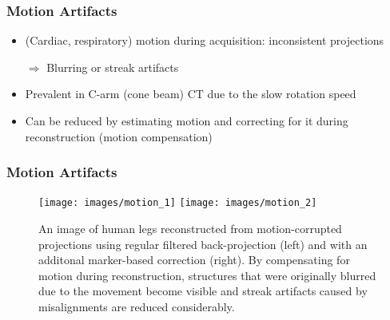\begin{frame}
	\frametitle{Motion Artifacts}

	\begin{itemize}
		\setlength\itemsep{0.3cm}
		\item (Cardiac, respiratory) motion during acquisition: inconsistent projections
		\item[$\Rightarrow$] Blurring or streak artifacts
		\item Prevalent in C-arm (cone beam) CT due to the slow rotation speed
		\item Can be reduced by estimating motion and correcting for it during reconstruction (motion compensation)

	\end{itemize}

\end{frame}


\begin{frame}
	\frametitle{Motion Artifacts}

	\begin{figure}[tbp]
		\centering
		\texttt{[image: images/motion\_1]}
		\hspace{1cm}
		\texttt{[image: images/motion\_2]}
		\caption{An image of human legs reconstructed from motion-corrupted projections using regular filtered back-projection (left) and with an additonal marker-based correction (right). By compensating for motion during reconstruction, structures that were originally blurred due to the movement become visible and streak artifacts caused by misalignments are reduced considerably.}%
		\label{fig:ct_motion}
	\end{figure}

\end{frame}




